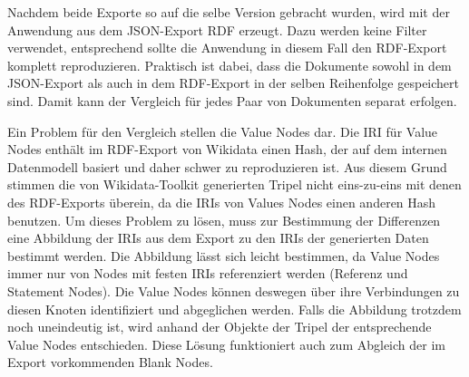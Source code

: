 Nachdem beide Exporte so auf die selbe Version gebracht wurden, wird mit der Anwendung aus dem JSON-Export RDF erzeugt.
Dazu werden keine Filter verwendet, entsprechend sollte die Anwendung in diesem Fall den RDF-Export komplett reproduzieren.
Praktisch ist dabei, dass die Dokumente sowohl in dem JSON-Export als auch in dem RDF-Export in der selben Reihenfolge gespeichert sind.
Damit kann der Vergleich für jedes Paar von Dokumenten separat erfolgen.

Ein Problem für den Vergleich stellen die Value Nodes dar.
Die IRI für Value Nodes enthält im RDF-Export von Wikidata einen Hash, der auf dem internen Datenmodell basiert und daher schwer zu reproduzieren ist.
Aus diesem Grund stimmen die von Wikidata-Toolkit generierten Tripel nicht eins-zu-eins mit denen des RDF-Exports überein, da die IRIs von Values Nodes einen anderen Hash benutzen.
Um dieses Problem zu lösen, muss zur Bestimmung der Differenzen eine Abbildung der IRIs aus dem Export zu den IRIs der generierten Daten bestimmt werden.
Die Abbildung lässt sich leicht bestimmen, da Value Nodes immer nur von Nodes mit festen IRIs referenziert werden (Referenz und Statement Nodes).
Die Value Nodes können deswegen über ihre Verbindungen zu diesen Knoten identifiziert und abgeglichen werden.
Falls die Abbildung trotzdem noch uneindeutig ist, wird anhand der Objekte der Tripel der entsprechende Value Nodes entschieden.
Diese Lösung funktioniert auch zum Abgleich der im Export vorkommenden Blank Nodes.

